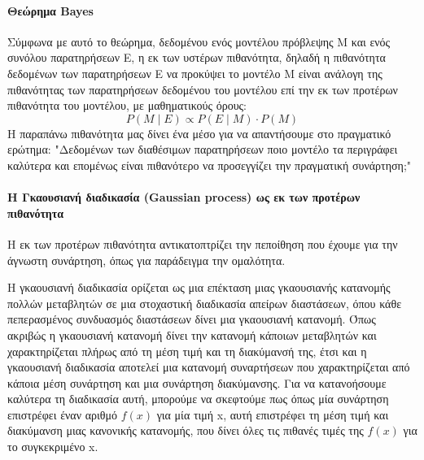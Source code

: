  	\paragraph{Θεώρημα Bayes} Σύμφωνα με αυτό το θεώρημα, δεδομένου ενός μοντέλου πρόβλεψης M και ενός συνόλου παρατηρήσεων Ε, η εκ των υστέρων πιθανότητα, δηλαδή η πιθανότητα δεδομένων των παρατηρήσεων Ε να προκύψει το μοντέλο M είναι ανάλογη της πιθανότητας των παρατηρήσεων δεδομένου του μοντέλου επί την εκ των προτέρων πιθανότητα του μοντέλου, με μαθηματικούς όρους:
 	\begin{equation}
 	P(M \mid E) \propto P(E \mid M) \cdot P(M)
 	\end{equation}
 	Η παραπάνω πιθανότητα μας δίνει ένα μέσο για να απαντήσουμε στο πραγματικό ερώτημα: "Δεδομένων των διαθέσιμων παρατηρήσεων ποιο μοντέλο τα περιγράφει καλύτερα και επομένως είναι πιθανότερο να προσεγγίζει την πραγματική συνάρτηση;"
 	\paragraph{Η Γκαουσιανή διαδικασία (Gaussian process) ως εκ των προτέρων πιθανότητα} Η εκ των προτέρων πιθανότητα αντικατοπτρίζει την πεποίθηση που έχουμε για την άγνωστη συνάρτηση, όπως για παράδειγμα την ομαλότητα.
 	
 	Η γκαουσιανή διαδικασία ορίζεται ως μια επέκταση μιας γκαουσιανής κατανομής πολλών μεταβλητών σε μια στοχαστική διαδικασία απείρων διαστάσεων, όπου κάθε πεπερασμένος συνδυασμός διαστάσεων δίνει μια γκαουσιανή κατανομή. Όπως ακριβώς η γκαουσιανή κατανομή δίνει την κατανομή κάποιων μεταβλητών και χαρακτηρίζεται πλήρως από τη μέση τιμή και τη διακύμανσή της, έτσι και η γκαουσιανή διαδικασία αποτελεί μια κατανομή συναρτήσεων που χαρακτηρίζεται από κάποια μέση
 	συνάρτηση και μια συνάρτηση διακύμανσης. Για να κατανοήσουμε καλύτερα τη διαδικασία αυτή, μπορούμε να σκεφτούμε πως όπως μία συνάρτηση επιστρέφει έναν αριθμό $f(x)$ για μία τιμή x, αυτή επιστρέφει τη μέση τιμή και διακύμανση μιας κανονικής κατανομής, που δίνει όλες τις πιθανές τιμές της $f(x)$ για το συγκεκριμένο x.
